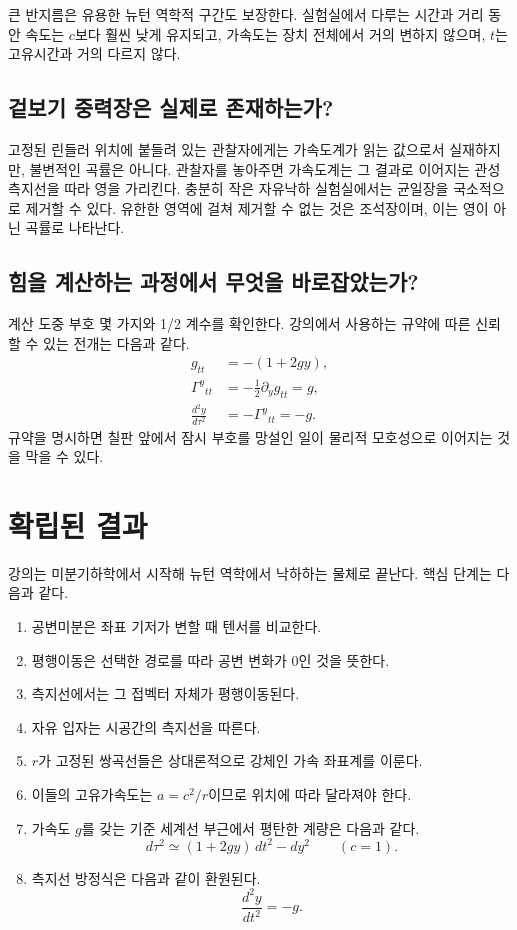 큰 반지름은 유용한 뉴턴 역학적 구간도 보장한다. 실험실에서 다루는 시간과 거리 동안 속도는 \(c\)보다 훨씬 낮게 유지되고, 가속도는 장치 전체에서 거의 변하지 않으며, \(t\)는 고유시간과 거의 다르지 않다.

\subsection{겉보기 중력장은 실제로 존재하는가?}

고정된 린들러 위치에 붙들려 있는 관찰자에게는 가속도계가 읽는 값으로서 실재하지만, 불변적인 곡률은 아니다. 관찰자를 놓아주면 가속도계는 그 결과로 이어지는 관성 측지선을 따라 영을 가리킨다. 충분히 작은 자유낙하 실험실에서는 균일장을 국소적으로 제거할 수 있다. 유한한 영역에 걸쳐 제거할 수 없는 것은 조석장이며, 이는 영이 아닌 곡률로 나타난다.

\subsection{힘을 계산하는 과정에서 무엇을 바로잡았는가?}

계산 도중 부호 몇 가지와 1/2 계수를 확인한다. 강의에서 사용하는 규약에 따른 신뢰할 수 있는 전개는 다음과 같다.
\begin{equation}
\begin{aligned}
g_{tt}&=-(1+2gy),\\
\Gamma^y{}_{tt}&=-\frac12\partial_yg_{tt}=g,\\
\frac{d^2y}{d\tau^2}&=-\Gamma^y{}_{tt}=-g.
\end{aligned}
\end{equation}
규약을 명시하면 칠판 앞에서 잠시 부호를 망설인 일이 물리적 모호성으로 이어지는 것을 막을 수 있다.

\section{확립된 결과}

강의는 미분기하학에서 시작해 뉴턴 역학에서 낙하하는 물체로 끝난다. 핵심 단계는 다음과 같다.
\begin{enumerate}
\item 공변미분은 좌표 기저가 변할 때 텐서를 비교한다.
\item 평행이동은 선택한 경로를 따라 공변 변화가 0인 것을 뜻한다.
\item 측지선에서는 그 접벡터 자체가 평행이동된다.
\item 자유 입자는 시공간의 측지선을 따른다.
\item \(r\)가 고정된 쌍곡선들은 상대론적으로 강체인 가속 좌표계를 이룬다.
\item 이들의 고유가속도는 \(a=c^2/r\)이므로 위치에 따라 달라져야 한다.
\item 가속도 \(g\)를 갖는 기준 세계선 부근에서 평탄한 계량은 다음과 같다.
\begin{equation}
d\tau^2\simeq(1+2gy)\,dt^2-dy^2
\qquad(c=1).
\end{equation}
\item 측지선 방정식은 다음과 같이 환원된다.
\begin{equation}
\frac{d^2y}{dt^2}=-g.
\end{equation}
\end{enumerate}

